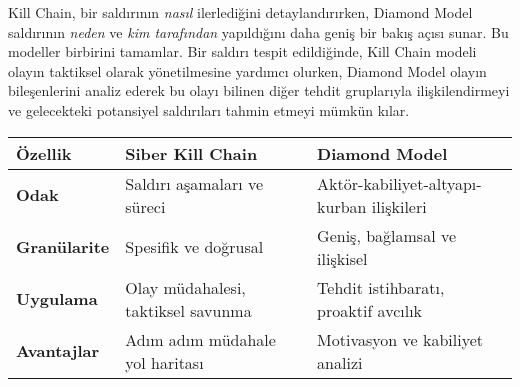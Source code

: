 Kill Chain, bir saldırının \textit{nasıl} ilerlediğini detaylandırırken, Diamond Model saldırının \textit{neden} ve \textit{kim tarafından} yapıldığını daha geniş bir bakış açısı sunar. Bu modeller birbirini tamamlar. Bir saldırı tespit edildiğinde, Kill Chain modeli olayın taktiksel olarak yönetilmesine yardımcı olurken, Diamond Model olayın bileşenlerini analiz ederek bu olayı bilinen diğer tehdit gruplarıyla ilişkilendirmeyi ve gelecekteki potansiyel saldırıları tahmin etmeyi mümkün kılar.

\begin{longtable}{|p{3cm}|p{5.5cm}|p{5.5cm}|}
\hline
\textbf{Özellik} & \textbf{Siber Kill Chain} & \textbf{Diamond Model} \\
\hline
\textbf{Odak} & Saldırı aşamaları ve süreci & Aktör-kabiliyet-altyapı-kurban ilişkileri \\
\hline
\textbf{Granülarite} & Spesifik ve doğrusal & Geniş, bağlamsal ve ilişkisel \\
\hline
\textbf{Uygulama} & Olay müdahalesi, taktiksel savunma & Tehdit istihbaratı, proaktif avcılık \\
\hline
\textbf{Avantajlar} & Adım adım müdahale yol haritası & Motivasyon ve kabiliyet analizi \\
\hline
\end{longtable}